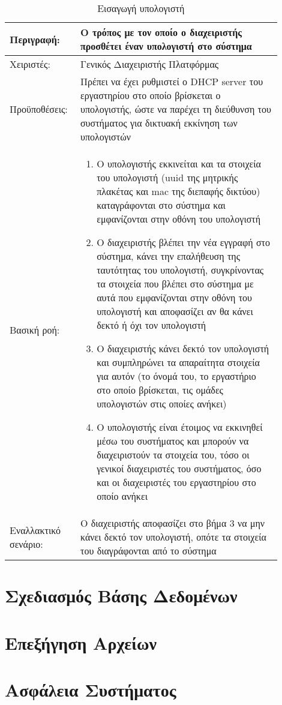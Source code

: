\begin{table}[h]
	\caption{Εισαγωγή υπολογιστή}
	\label{tab:use-case-add-computer}
	\begin{tabular}{|p{0.2\linewidth}|p{0.7\linewidth}|}
		\hline
		Περιγραφή: & Ο τρόπος με τον οποίο ο διαχειριστής προσθέτει έναν υπολογιστή στο σύστημα \\ \hline
		Χειριστές: & Γενικός Διαχειριστής Πλατφόρμας \\ \hline
		Προϋποθέσεις: & Πρέπει να έχει ρυθμιστεί ο DHCP server του εργαστηρίου στο οποίο βρίσκεται ο υπολογιστής, ώστε να παρέχει τη διεύθυνση του συστήματος για δικτυακή εκκίνηση των υπολογιστών \\ \hline
		Βασική ροή: & 
		\begin{enumerate}
			\item Ο υπολογιστής εκκινείται και τα στοιχεία του υπολογιστή (uuid της μητρικής πλακέτας και mac της διεπαφής δικτύου) καταγράφονται στο σύστημα και εμφανίζονται στην οθόνη του υπολογιστή
			\item Ο διαχειριστής βλέπει την νέα εγγραφή στο σύστημα, κάνει την επαλήθευση της ταυτότητας του υπολογιστή, συγκρίνοντας τα στοιχεία που βλέπει στο σύστημα με αυτά που εμφανίζονται στην οθόνη του υπολογιστή και αποφασίζει αν θα κάνει δεκτό ή όχι τον υπολογιστή
			\item Ο διαχειριστής κάνει δεκτό τον υπολογιστή και συμπληρώνει τα απαραίτητα στοιχεία για αυτόν (το όνομά του, το εργαστήριο στο οποίο βρίσκεται, τις ομάδες υπολογιστών στις οποίες ανήκει)
			\item Ο υπολογιστής είναι έτοιμος να εκκινηθεί μέσω του συστήματος και μπορούν να διαχειριστούν τα στοιχεία του, τόσο οι γενικοί διαχειριστές του συστήματος, όσο και οι διαχειριστές του εργαστηρίου στο οποίο ανήκει
		\end{enumerate} \\ \hline
		Εναλλακτικό σενάριο: & Ο διαχειριστής αποφασίζει στο βήμα 3 να μην κάνει δεκτό τον υπολογιστή, οπότε τα στοιχεία του διαγράφονται από το σύστημα \\ \hline
	\end{tabular}
\end{table}

\section{Σχεδιασμός Βάσης Δεδομένων}



\section{Επεξήγηση Αρχείων}

\section{Ασφάλεια Συστήματος}
